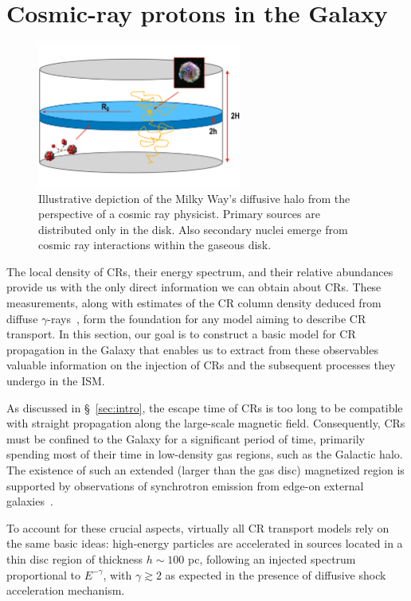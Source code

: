 \section{Cosmic-ray protons in the Galaxy}
\label{sec:protons}

\begin{figure}[t]
\centering
\includegraphics[width=0.6\textwidth]{figures/halo.pdf}
\caption{Illustrative depiction of the Milky Way's diffusive halo from the perspective of a cosmic ray physicist. Primary sources are distributed only in the disk. Also secondary nuclei emerge from cosmic ray interactions within the gaseous disk.}
\label{fig:galaxy}
\end{figure}

The local density of CRs, their energy spectrum, and their relative abundances provide us with the only direct information we can obtain about CRs. These measurements, along with estimates of the CR column density deduced from diffuse $\gamma$-rays~\cite{Tibaldo2021universe, Grenier2015araa}, form the foundation for any model aiming to describe CR transport.
%
In this section, our goal is to construct a basic model for CR propagation in the Galaxy that enables us to extract from these observables valuable information on the injection of CRs and the subsequent processes they undergo in the ISM.

As discussed in \S~\ref{sec:intro}, the escape time of CRs is too long to be compatible with straight propagation along the large-scale magnetic field. Consequently, CRs must be confined to the Galaxy for a significant period of time, primarily spending most of their time in low-density gas regions, such as the Galactic halo.
%
The existence of such an extended (larger than the gas disc) magnetized region is supported by observations of synchrotron emission from edge-on external galaxies~\cite{Beck2015aar}.

To account for these crucial aspects, virtually all CR transport models rely on the same basic ideas: high-energy particles are accelerated in sources located in a thin disc region of thickness $h \sim 100$ pc, following an injected spectrum proportional to $E^{-\gamma}$, with $\gamma \gtrsim 2$ as expected in the presence of diffusive shock acceleration mechanism.

